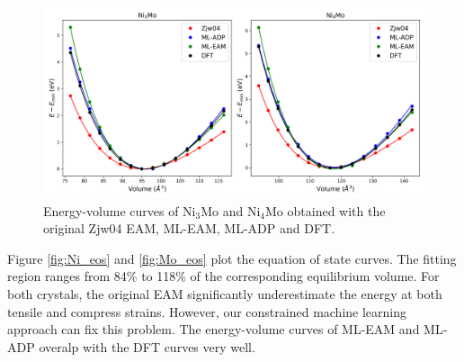 \documentclass[prb,reprint]{revtex4-2}
\begin{document}
% 
%
\begin{figure}
\centering
\includegraphics[scale=0.5]{figures/alloy_eos.png}
\caption{\label{fig:alloy_eos} Energy-volume curves of Ni$_3$Mo and Ni$_4$Mo 
obtained with the original Zjw04 EAM, ML-EAM, ML-ADP and DFT.}
\end{figure}

Figure \ref{fig:Ni_eos} and \ref{fig:Mo_eos} plot the equation of state 
curves. The fitting region ranges from 84\% to 118\% of the corresponding 
equilibrium volume. For both crystals, the original EAM significantly 
underestimate the energy at both tensile and compress strains. However, our 
constrained machine learning approach can fix this problem. The 
energy-volume curves of ML-EAM and ML-ADP overalp with the DFT curves very well. 
\end{document}
